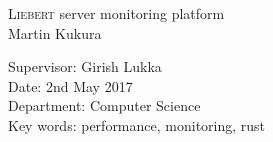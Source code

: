 \documentclass[12pt,a4paper,table]{article}
\begin{document}
    \begin{titlepage}
        \vspace*{1.5cm}
        \begin{center}
            \Huge{\textsc{Liebert} server monitoring platform}\\
            \Large{Martin Kukura}\\
        \end{center}
        \vspace*{\fill}
        \begin{center}
            \Large{Supervisor: Girish Lukka}\\
            \Large{Date: 2nd May 2017}\\
            \Large{Department: Computer Science}\\
            \Large{Key words: performance, monitoring, rust}\\
        \end{center}
        \vspace*{\fill}
    \end{titlepage}
    \clearpage

    \tableofcontents
	\clearpage
    \listoffigures

    \clearpage
    
    
    \clearpage
    
    \clearpage
    
    \clearpage
    
    \clearpage
    
    \clearpage
    
    \clearpage
    
    \clearpage
    
    \clearpage
    
    \clearpage
    
\end{document}
